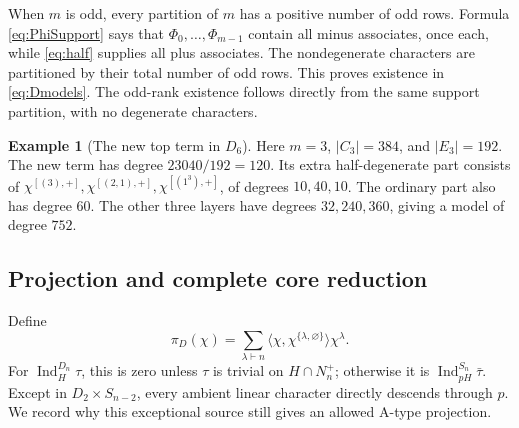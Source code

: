 \documentclass[11pt]{article}
\numberwithin{equation}{section}
\theoremstyle{definition}
\newtheorem{example}[theorem]{Example}
\DeclareMathOperator{\Ind}{Ind}
\newcommand{\emptypar}{\varnothing}
\begin{document}
When \(m\) is odd, every partition of \(m\) has a positive number of odd rows.
Formula \eqref{eq:PhiSupport} says that \(\Phi_0,\ldots,\Phi_{m-1}\) contain all minus associates, once each, while \eqref{eq:half} supplies all plus associates.
The nondegenerate characters are partitioned by their total number of odd rows.
This proves existence in \eqref{eq:Dmodels}.
The odd-rank existence follows directly from the same support partition, with no degenerate characters.

\begin{example}[The new top term in \(D_6\)]
Here \(m=3\), \(|C_3|=384\), and \(|E_3|=192\).
The new term has degree \(23040/192=120\).
Its extra half-degenerate part consists of
\(\chi^{[(3),+]},\chi^{[(2,1),+]},\chi^{[(1^3),+]}\), of degrees \(10,40,10\).
The ordinary part also has degree \(60\).
The other three layers have degrees \(32,240,360\), giving a model of degree \(752\).
\end{example}

\subsection{Projection and complete core reduction}

Define
\[
 \pi_D(\chi)=\sum_{\lambda\vdash n}
      \langle\chi,\chi^{\{\lambda,\emptypar\}}\rangle\chi^\lambda .
\]
For \(\Ind_H^{D_n}\tau\), this is zero unless \(\tau\) is trivial on \(H\cap N_n^+\); otherwise it is \(\Ind_{pH}^{S_n}\bar\tau\).
Except in \(D_2\times S_{n-2}\), every ambient linear character directly descends through \(p\).
We record why this exceptional source still gives an allowed A-type projection.
\end{document}
